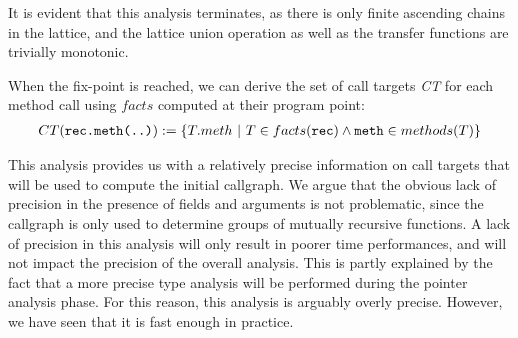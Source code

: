 It is evident that this analysis terminates, as there is only finite ascending
chains in the lattice, and the lattice union operation as well as the transfer
functions are trivially monotonic.

When the fix-point is reached, we can derive the set of call targets \emph{CT}
for each method call using $facts$ computed at their program point:
\begin{eqnarray*}
    CT(\verb/rec.meth(..)/) := \{ T.meth ~|~ T \in facts(\verb/rec/) \land \verb/meth/ \in methods(T) \}
\end{eqnarray*}

This analysis provides us with a relatively precise information on call targets
that will be used to compute the initial callgraph. We argue that the obvious
lack of precision in the presence of fields and arguments is not problematic,
since the callgraph is only used to determine groups of mutually recursive
functions. A lack of precision in this analysis will only result in poorer time
performances, and will not impact the precision of the overall analysis. This
is partly explained by the fact that a more precise type analysis will be
performed during the pointer analysis phase. For this reason, this analysis is
arguably overly precise. However, we have seen that it is fast enough in
practice.

